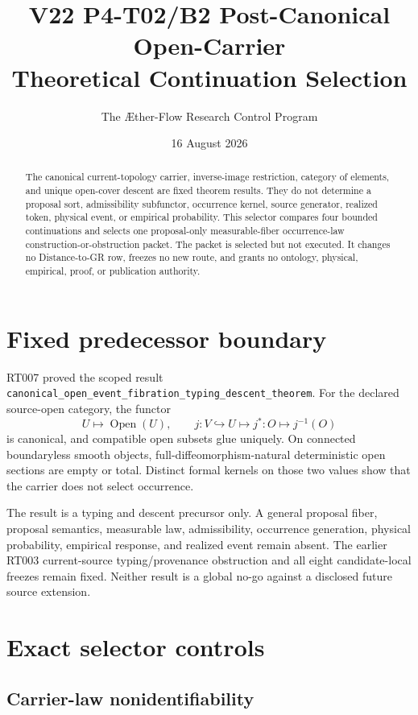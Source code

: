\documentclass[11pt]{article}
\title{V22 P4-T02/B2 Post-Canonical Open-Carrier\\Theoretical Continuation Selection}
\author{The \AE ther-Flow Research Control Program}
\date{16 August 2026}
\newcommand{\Open}{\operatorname{Open}}
\begin{document}
\maketitle

\begin{abstract}
The canonical current-topology carrier, inverse-image restriction, category of
elements, and unique open-cover descent are fixed theorem results. They do not
determine a proposal sort, admissibility subfunctor, occurrence kernel, source
generator, realized token, physical event, or empirical probability. This
selector compares four bounded continuations and selects one proposal-only
measurable-fiber occurrence-law construction-or-obstruction packet. The packet
is selected but not executed. It changes no Distance-to-GR row, freezes no new
route, and grants no ontology, physical, empirical, proof, or publication
authority.
\end{abstract}

\section{Fixed predecessor boundary}

RT007 proved the scoped result
\texttt{canonical\_open\_event\_fibration\_typing\_descent\_theorem}. For
the declared source-open category, the functor
\begin{equation}
  U\longmapsto \Open(U),\qquad
  j:V\hookrightarrow U\longmapsto j^*:O\longmapsto j^{-1}(O)
\end{equation}
is canonical, and compatible open subsets glue uniquely. On connected
boundaryless smooth objects, full-diffeomorphism-natural deterministic open
sections are empty or total. Distinct formal kernels on those two values show
that the carrier does not select occurrence.

The result is a typing and descent precursor only. A general proposal fiber,
proposal semantics, measurable law, admissibility, occurrence generation,
physical probability, empirical response, and realized event remain absent.
The earlier RT003 current-source typing/provenance obstruction and all eight
candidate-local freezes remain fixed. Neither result is a global no-go against
a disclosed future source extension.

\section{Exact selector controls}

\subsection{Carrier-law nonidentifiability}
\end{document}
